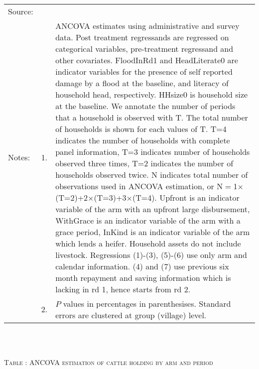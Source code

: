 \begin{minipage}[t]{14cm}
  \hfil{}\\
\renewcommand{\arraystretch}{.8}
\setlength{\tabcolsep}{1pt} \begin{tabular}{>{\hfill\scriptsize}p{1cm}<{}>{\hfill\scriptsize}p{.25cm}<{}>{\scriptsize}p{12cm}<{\hfill}} 
Source:& \multicolumn{2}{l}{\scriptsize Estimated with GUK administrative and survey data.}\\
Notes: & 1. & ANCOVA estimates using administrative and survey data. Post treatment regressands are regressed on categorical variables, pre-treatment regressand and other covariates. \textsf{FloodInRd1} and \textsf{HeadLiterate0} are indicator variables for the presence of self reported damage by a flood at the baseline, and literacy of household head, respectively. \textsf{HHsize0} is household size at the baseline. We annotate the number of periods that a household is observed with \textsf{T}. The total number of households is shown for each values of \textsf{T}. \textsf{T=4} indicates the number of households with complete panel information, \textsf{T=3} indicates number of households observed three times, \textsf{T=2} indicates the number of households observed twice. \textsf{N} indicates total number of observations used in ANCOVA estimation, or \textsf{N$=$1$\times$(T=2)+2$\times$(T=3)+3$\times$(T=4)}.  \textsf{Upfront} is an indicator variable of the arm with an upfront large disbursement, \textsf{WithGrace} is an indicator variable of the arm with a grace period, \textsf{InKind} is an indicator variable of the arm which lends a heifer. Household assets do not include livestock. Regressions (1)-(3), (5)-(6) use only arm and calendar information. (4) and (7) use previous six month repayment and saving information which is lacking in rd 1, hence starts from rd 2.\\
& 2. &  $P$ values in percentages in parenthesises. Standard errors are clustered at group (village) level. %
 \end{tabular}
\end{minipage} \\\\\hspace{-1cm}\begin{minipage}[t]{14cm} \hfil\textsc{\normalsize Table \thetable: ANCOVA estimation of cattle holding by arm and period\label{tab ANCOVA cow time varying}}\\ \setlength{\tabcolsep}{1pt}

\end{minipage}
